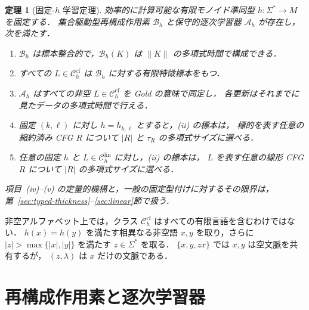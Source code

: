 \documentclass[11pt,a4paper]{ltjsarticle}
\newtheorem{theorem}{定理}[section]
\theoremstyle{remark}
\theoremstyle{plain}
\newcommand{\cf}{\mathrm{cf}}
\newcommand{\lin}{\mathrm{lin}}
\newcommand{\Ccf}[1]{\mathcal C_{#1}^{\cf}}
\newcommand{\Clin}[1]{\mathcal C_{#1}^{\lin}}
\begin{document}
\begin{theorem}[固定-$h$ 学習定理]\label{thm:main}
効率的に計算可能な有限モノイド準同型 $h:\Sigma^*\to M$ を固定する．
集合駆動型再構成作用素 $\mathcal B_h$ と保守的逐次学習器 $\mathcal A_h$ が存在し，
次を満たす．
\begin{enumerate}[label=\textup{(\roman*)},nosep]
\item $\mathcal B_h$ は標本整合的で，$\mathcal B_h(K)$ は $\|K\|$ の多項式時間で構成できる．
\item すべての $L\in\Ccf{h}$ は $\mathcal B_h$ に対する有限特徴標本をもつ．
\item $\mathcal A_h$ はすべての非空 $L\in\Ccf{h}$ を Gold の意味で同定し，
各更新はそれまでに見たデータの多項式時間で行える．
\item 固定 $(k,\ell)$ に対し $h=h_{k,\ell}$ とすると，(ii) の標本は，
標的を表す任意の縮約済み CFG $R$ について $|R|$ と $\tau_R$ の多項式サイズに選べる．
\item 任意の固定 $h$ と $L\in\Clin{h}$ に対し，(ii) の標本は，
$L$ を表す任意の線形 CFG $R$ について $|R|$ の多項式サイズに選べる．
\end{enumerate}
項目~(iv)--(v) の定量的機構と，一般の固定型付けに対するその限界は，
第~\ref{sec:typed-thickness}--\ref{sec:linear}節で扱う．
\end{theorem}

非空アルファベット上では，クラス $\Ccf{h}$ はすべての有限言語を含むわけではない．
$h(x)=h(y)$ を満たす相異なる非空語 $x,y$ を取り，さらに
$|z|>\max\{|x|,|y|\}$ を満たす $z\in\Sigma^*$ を取る．
$\{x,y,zx\}$ では $x,y$ は空文脈を共有するが，
$(z,\lambda)$ は $x$ だけの文脈である．

\section{再構成作用素と逐次学習器}
\label{sec:algo}
\end{document}
